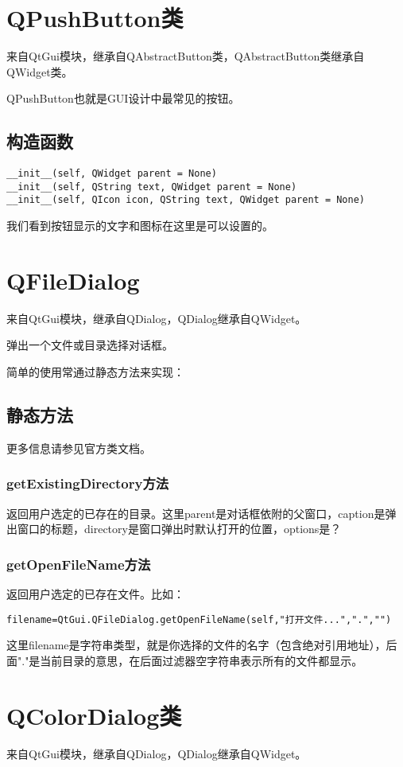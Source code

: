 \documentclass[12pt,oneside]{book}
\begin{document}
\begin{common-format}
\section{QPushButton类}
来自QtGui模块，继承自QAbstractButton类，QAbstractButton类继承自QWidget类。

QPushButton也就是GUI设计中最常见的按钮。

\subsection{构造函数}
\begin{Verbatim}
__init__(self, QWidget parent = None)
__init__(self, QString text, QWidget parent = None)
__init__(self, QIcon icon, QString text, QWidget parent = None)
\end{Verbatim}
我们看到按钮显示的文字和图标在这里是可以设置的。


\section{QFileDialog}
来自QtGui模块，继承自QDialog，QDialog继承自QWidget。

弹出一个文件或目录选择对话框。

简单的使用常通过静态方法来实现：
\subsection{静态方法}
更多信息请参见官方类文档。

\subsubsection{getExistingDirectory方法}
返回用户选定的已存在的目录。这里parent是对话框依附的父窗口，caption是弹出窗口的标题，directory是窗口弹出时默认打开的位置，options是？

\subsubsection{getOpenFileName方法}
返回用户选定的已存在文件。比如：
\begin{Verbatim}
filename=QtGui.QFileDialog.getOpenFileName(self,"打开文件...",".","")
\end{Verbatim}
这里filename是字符串类型，就是你选择的文件的名字（包含绝对引用地址），后面"."是当前目录的意思，在后面过滤器空字符串表示所有的文件都显示。


\section{QColorDialog类}
来自QtGui模块，继承自QDialog，QDialog继承自QWidget。


\end{common-format}
\end{document}
